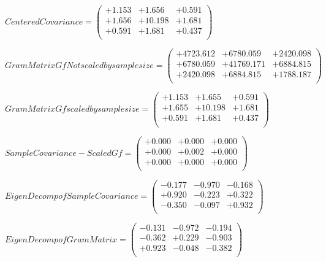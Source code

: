 \documentclass[9pt]{article}
\theoremstyle{plain}
\theoremstyle{definition}
\theoremstyle{remark}
\numberwithin{equation}{section}
\begin{document}
$Centered Covariance = \left(
\begin{array}{
ccc}
+1.153 & +1.656 & +0.591 \\
+1.656 & +10.198 & +1.681 \\
+0.591 & +1.681 & +0.437 \\
\end{array}
\right)$ \newline 

$Gram Matrix Gf Not scaled by sample size = \left(
\begin{array}{
ccc}
+4723.612 & +6780.059 & +2420.098 \\
+6780.059 & +41769.171 & +6884.815 \\
+2420.098 & +6884.815 & +1788.187 \\
\end{array}
\right)$ \newline 

$Gram Matrix Gf  scaled by sample size = \left(
\begin{array}{
ccc}
+1.153 & +1.655 & +0.591 \\
+1.655 & +10.198 & +1.681 \\
+0.591 & +1.681 & +0.437 \\
\end{array}
\right)$ \newline 

$SampleCovariance - Scaled Gf = \left(
\begin{array}{
ccc}
+0.000 & +0.000 & +0.000 \\
+0.000 & +0.002 & +0.000 \\
+0.000 & +0.000 & +0.000 \\
\end{array}
\right)$ \newline 

$EigenDecomp of SampleCovariance = \left(
\begin{array}{
ccc}
-0.177 & -0.970 & -0.168 \\
+0.920 & -0.223 & +0.322 \\
-0.350 & -0.097 & +0.932 \\
\end{array}
\right)$ \newline 

$EigenDecomp of Gram Matrix = \left(
\begin{array}{
ccc}
-0.131 & -0.972 & -0.194 \\
-0.362 & +0.229 & -0.903 \\
+0.923 & -0.048 & -0.382 \\
\end{array}
\right)$ \newline 
\end{document}
